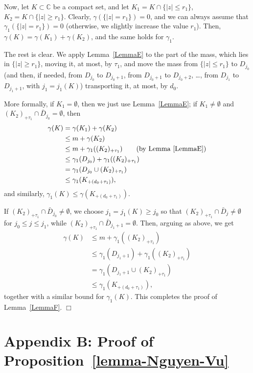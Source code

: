 \documentclass[11pt]{amsart}
\numberwithin{equation}{section}
\newcommand{\bC}{\mathbb C}
\begin{document}
Now, let $K\subset\bC$ be a compact set, and let $K_1 = K\cap \{|z|\le r_1\}$,
$K_2 = K\cap \{|z|\ge r_1\}$. Clearly, $\gamma (\{|z|=r_1\}) = 0$, and we can always assume that
$\gamma_1 (\{|z|=r_1\}) = 0$ (otherwise, we slightly increase the value $r_1$). Then,
$\gamma(K)=\gamma(K_1)+\gamma(K_2)$, and the same holds for $\gamma_1$.

The rest is clear. We apply Lemma~\ref{LemmaE} to the part of the mass, which lies
in $\{|z|\ge r_1\}$, moving it, at most, by $\tau_1$, and move the mass from $\{|z|\le r_1\}$
to $D_{j_0}$ (and then, if needed, from $D_{j_0}$ to $D_{j_0+1}$, from $D_{j_0+1}$ to
$D_{j_0+2}$, \ldots , from $D_{j_1}$ to $D_{j_1+1}$, with $j_1=j_1(K)$) transporting it,
at most, by $d_0$.

More formally, if $K_1=\emptyset$, then we just use Lemma~\ref{LemmaE}; if $K_1\not=\emptyset$ and 
$(K_2)_{+\tau_1}\cap\bar D_{j_0}=\emptyset$, then
\begin{align*}
\gamma (K) &= \gamma(K_1) + \gamma (K_2) \\
&\le m + \gamma(K_2) \\
&\le m + \gamma_1((K_2)_{+\tau_1}) \qquad ({\rm by\ Lemma~\ref{LemmaE}}) \\
&\le \gamma_1(D_{j_0})  + \gamma_1((K_2)_{+\tau_1}) \\
&= \gamma_1 (D_{j_0} \cup (K_2)_{+\tau_1}) \\
&\le \gamma_1 (K_{+(d_0+\tau_1)}),
\end{align*}
and similarly, $\gamma_1(K)\le \gamma (K_{+(d_0+\tau_1)})$.

If $(K_2)_{+\tau_1}\cap\bar D_{j_0} \ne \emptyset$, we
choose $j_1 = j_1(K) \ge j_0$ so that
$(K_2)_{+\tau_1}\cap \bar D_j \ne \emptyset$ for $j_0\le j \le j_1$, while
$(K_2)_{+\tau_1}\cap \bar D_{j_1+1} = \emptyset$. Then, arguing as above,
we get
\begin{align*}
\gamma (K) &\le m + \gamma_1((K_2)_{+\tau_1}) \\
&\le \gamma_1(D_{j_1+1}) + \gamma_1((K_2)_{+\tau_1})  \\
&=\gamma_1(D_{j_1+1} \cup (K_2)_{+\tau_1}) \\
&\le\gamma_1 (K_{+(d_0+\tau_1)}),
\end{align*}
together with a similar bound for $\gamma_1(K)$. This completes the proof of Lemma~\ref{LemmaF}.
\hfill $\Box$



\section*{Appendix B: Proof of Proposition~\ref{lemma-Nguyen-Vu}}
\renewcommand{\theequation}{B.\arabic{equation}}
\setcounter{equation}{0}
\renewcommand{\thelemma}{B.\arabic{lemma}}
\setcounter{lemma}{0}
\end{document}
